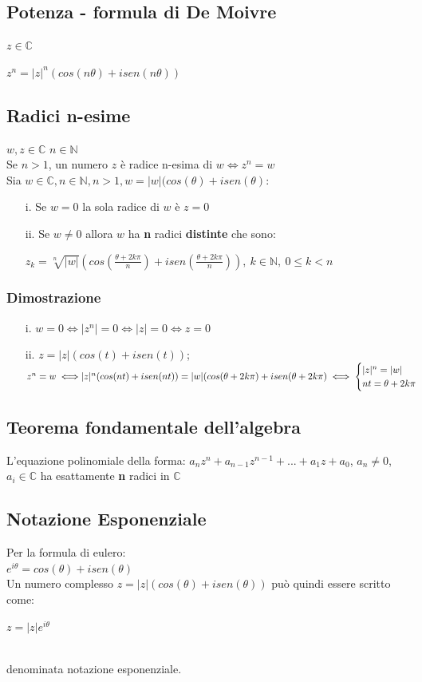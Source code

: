 \subsection{Potenza - formula di De Moivre}
$z \in \mathbb{C}$\\
\begin{Large}
$z^n = |z|^n(cos(n\theta)+isen(n\theta))$
\end{Large}
\subsection{Radici n-esime}
$w,z \in \mathbb{C}$\; $n \in \mathbb{N}$\\
Se $n>1$, un numero $z$ è radice n-esima di $w \iff z^n=w$\\
Sia $w \in \mathbb{C}, n \in \mathbb{N}, n>1, w=|w|(cos(\theta)+isen(\theta)$:\\
\begin{enumerate}
\item[i.] Se $w=0$ la sola radice di $w$ è $z=0$
\item[ii.] Se $w\neq0$ allora $w$ ha \textbf{n} radici \textbf{distinte} che sono:\\
\begin{Large}
$z_k=\sqrt[n]{|w|}(cos(\frac{\theta+2k\pi}{n})+isen(\frac{\theta+2k\pi}{n})),\ k \in \mathbb{N},\ 0\leq k<n$
\end{Large}
\end{enumerate}
\subsubsection{Dimostrazione}
\begin{enumerate}
\item[i.]$w=0 \iff |z^n|=0 \iff |z|=0 \iff z=0$
\item[ii.]$z=|z|(cos(t)+isen(t))$; $z^n=w \iff \\
|z|^n(cos(nt)+isen(nt)) = |w|(cos(\theta+2k\pi)+isen(\theta +2k\pi) \iff
\begin{cases}
|z|^n = |w|\\
nt = \theta +2k\pi
\end{cases}$
\end{enumerate}
\subsection{Teorema fondamentale dell'algebra}
L'equazione polinomiale della forma: $a_nz^n + a_{n-1}z^{n-1}+...+a_1z+a_0$, $a_n \neq 0$, $a_i \in \mathbb{C}$ ha esattamente \textbf{n} radici in $\mathbb{C}$

\subsection{Notazione Esponenziale}
Per la formula di eulero:\\
$e^{i\theta} = cos(\theta)+isen(\theta)$\\
Un numero complesso $z = |z|(cos(\theta)+isen(\theta))$ può quindi essere scritto come:\\
\begin{Large}
$z = |z|e^{i\theta}$
\end{Large}\\
denominata notazione esponenziale.